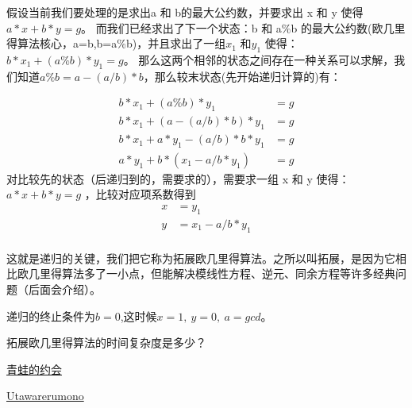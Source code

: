 假设当前我们要处理的是求出a 和 b的最大公约数，并要求出 x 和 y 使得 $a * x + b * y=g$。
而我们已经求出了下一个状态：b 和 a\%b 的最大公约数({\heiti 欧几里得算法核心，a=b,b=a\%b})，并且求出了一组$x_1$ 和$y_1$ 使得：$ b * x_1 + (a\%b) * y_1 = g$。
那么这两个相邻的状态之间存在一种关系可以求解，我们知道$a\%b = a - (a/b)*b$，那么较末状态(先开始递归计算的)有：

\begin{align*}
b * x_1 + (a\%b) * y_1 &= g\\
b*x_{1} + (a-(a/b)*b) * y_{1} &= g \\
b*x_{1} + a*y_{1}-(a/b)*b*y_{1} &=g\\
a*y_{1} + b*(x_{1}-a/b*y_{1})&= g
\end{align*}
对比较先的状态（后递归到的，需要求的），需要求一组 x 和 y 使得：$a*x + b*y = g$ ，比较对应项系数得到
\begin{align*}
x &= y_1\\
y &= x_1 - a/b * y_1 \\
\end{align*}


这就是递归的关键，我们把它称为{\heiti 拓展欧几里得算法}。之所以叫拓展，是因为它相比欧几里得算法多了一小点，但能解决模线性方程、逆元、同余方程等许多经典问题（后面会介绍）。

递归的终止条件为$b=0$,这时候$x=1,\ y=0,\ a = gcd$。



\vbox{}

\begin{problemset}
	\item 拓展欧几里得算法的时间复杂度是多少？
	\item \href{http://poj.org/problem?id=1061}{青蛙的约会}
	\item \href{https://ac.nowcoder.com/acm/contest/201/C}{Utawarerumono}
\end{problemset}










